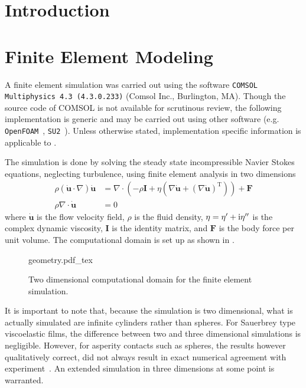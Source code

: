 \section{Introduction}

\section{Finite Element Modeling} \label{sec:finiteelementdingus}
A finite element simulation was carried out using the software
\texttt{COMSOL Multiphysics 4.3 (4.3.0.233)} (Comsol Inc., Burlington, MA).
Though the source code of COMSOL is not available for scrutinous review,
the following implementation is generic and may be carried out using other
software (e.g. \texttt{OpenFOAM}~\cite{jasak2007openfoam},
\texttt{SU2}~\cite{palacios2013stanford}).  Unless otherwise stated,
implementation specific information is applicable to \comsol.

The simulation is done by solving the steady state incompressible Navier
Stokes equations, neglecting turbulence, using finite element analysis in
two dimensions
\begin{align}
 \rho\left(\mathbf{\dot{u}}\cdot \nabla\right)\mathbf{\dot{u}}
 &=\nabla \cdot \left( -\rho \mathbf{I} + \eta \left(\nabla \mathbf{\dot{u}} +
 \left( \nabla \mathbf{\dot{u}}\right)^\mathrm{T}\right)\right) + \mathbf{F}\\
 \rho \nabla \cdot \mathbf{\dot{u}} &= 0
\end{align}
where $\mathbf{\dot{u}}$ is the flow velocity field, $\rho$ is the fluid
density, $\eta = \eta^\prime + {\mathrm{i}}\eta^{\prime\prime}$ is the complex
dynamic viscosity, $\mathbf{I}$ is the identity matrix, and $\mathbf{F}$ is
the body force per unit volume.  The computational domain is set up as
shown in .  
\begin{figure}[h]
 \centering
 {geometry.pdf_tex}
 \caption{Two dimensional computational domain for the finite element simulation.}
 \label{fig:compgeometry}
\end{figure}

It is important to note that, because the simulation is two dimensional,
what is actually simulated are infinite cylinders rather than spheres.  For
Sauerbrey type viscoelastic films, the difference between two and three
dimensional simulations is negligible.  However, for asperity contacts such
as spheres, the results however qualitatively correct, did not always
result in exact numerical agreement with
experiment~\cite{Vittorias2010489}.  An extended simulation in three
dimensions at some point is warranted.

